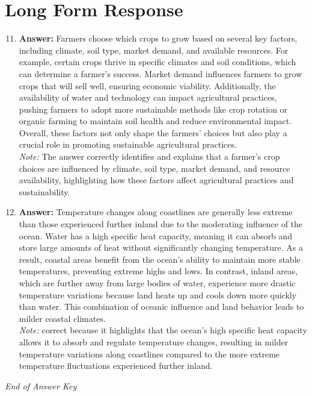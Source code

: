 \documentclass[12pt]{article}
\begin{document}
\section*{Long Form Response}
\begin{enumerate}[label=\arabic*.]
\setcounter{enumi}{10}
\item \textbf{Answer:} Farmers choose which crops to grow based on several key factors, including climate, soil type, market demand, and available resources. For example, certain crops thrive in specific climates and soil conditions, which can determine a farmer's success. Market demand influences farmers to grow crops that will sell well, ensuring economic viability. Additionally, the availability of water and technology can impact agricultural practices, pushing farmers to adopt more sustainable methods like crop rotation or organic farming to maintain soil health and reduce environmental impact. Overall, these factors not only shape the farmers' choices but also play a crucial role in promoting sustainable agricultural practices.
\\ \textit{Note:} The answer correctly identifies and explains that a farmer's crop choices are influenced by climate, soil type, market demand, and resource availability, highlighting how these factors affect agricultural practices and sustainability.
\item \textbf{Answer:} Temperature changes along coastlines are generally less extreme than those experienced further inland due to the moderating influence of the ocean. Water has a high specific heat capacity, meaning it can absorb and store large amounts of heat without significantly changing temperature. As a result, coastal areas benefit from the ocean's ability to maintain more stable temperatures, preventing extreme highs and lows. In contrast, inland areas, which are further away from large bodies of water, experience more drastic temperature variations because land heats up and cools down more quickly than water. This combination of oceanic influence and land behavior leads to milder coastal climates.
\\ \textit{Note:} correct because it highlights that the ocean's high specific heat capacity allows it to absorb and regulate temperature changes, resulting in milder temperature variations along coastlines compared to the more extreme temperature fluctuations experienced further inland.
\end{enumerate}

\vfill
\noindent\textit{End of Answer Key}
\end{document}
